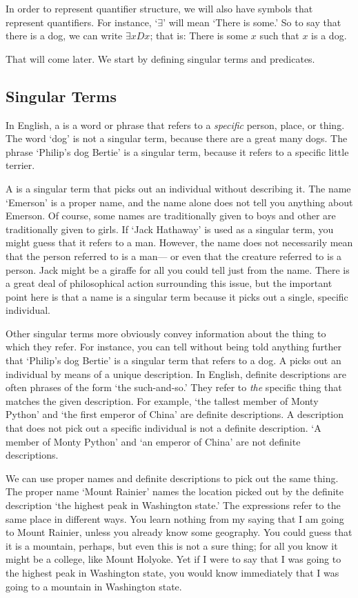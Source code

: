 In order to represent quantifier structure, we will also have symbols that represent quantifiers. For instance, `$\exists$' will mean `There is some\blank.' So to say that there is a dog, we can write $\exists x Dx$; that is: There is some $x$ such that $x$ is a dog.

That will come later. We start by defining singular terms and predicates.


\subsection{Singular Terms}
In English, a  is a word or phrase that refers to a \emph{specific} person, place, or thing. The word `dog' is not a singular term, because there are a great many dogs. The phrase `Philip's dog Bertie' is a singular term, because it refers to a specific little terrier.

A  is a singular term that picks out an individual without describing it. The name `Emerson' is a proper name, and the name alone does not tell you anything about Emerson. Of course, some names are traditionally given to boys and other are traditionally given to girls. If `Jack Hathaway' is used as a singular term, you might guess that it refers to a man. However, the name does not necessarily mean that the person referred to is a man--- or even that the creature referred to is a person. Jack might be a giraffe for all you could tell just from the name. There is a great deal of philosophical action surrounding this issue, but the important point here is that a name is a singular term because it picks out a single, specific individual.

Other singular terms more obviously convey information about the thing to which they refer. For instance, you can tell without being told anything further that `Philip's dog Bertie' is a singular term that refers to a dog. A  picks out an individual by means of a unique description. In English, definite descriptions are often phrases of the form `the such-and-so.' They refer to \emph{the} specific thing that matches the given description. For example, `the tallest member of Monty Python' and `the first emperor of China' are definite descriptions. A description that does not pick out a specific individual is not a definite description. `A member of Monty Python' and `an emperor of China' are not definite descriptions.

We can use proper names and definite descriptions to pick out the same thing. The proper name `Mount Rainier' names the location picked out by the definite description `the highest peak in Washington state.' The expressions refer to the same place in different ways. You learn nothing from my saying that I am going to Mount Rainier, unless you already know some geography. You could guess that it is a mountain, perhaps, but even this is not a sure thing; for all you know it might be a college, like Mount Holyoke. Yet if I were to say that I was going to the highest peak in Washington state, you would know immediately that I was going to a mountain in Washington state.

